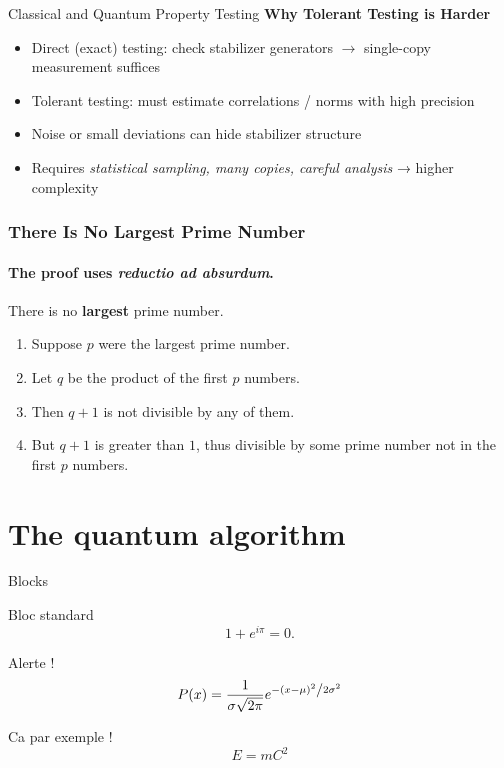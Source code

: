 \documentclass[9pt]{beamer}
\begin{document}
\begin{frame}{Classical and Quantum Property Testing}
\textbf{Why Tolerant Testing is Harder}
\begin{itemize}
    \item Direct (exact) testing: check stabilizer generators $\rightarrow$ single-copy measurement suffices
    \item Tolerant testing: must estimate correlations / norms with high precision
    \item Noise or small deviations can hide stabilizer structure
    \item Requires \textit{statistical sampling, many copies, careful analysis} → higher complexity
\end{itemize}

\end{frame}


\begin{frame} 
\frametitle{There Is No Largest Prime Number} 
\framesubtitle{The proof uses \textit{reductio ad absurdum}.} 
\begin{theorem}
	There is no \textbf{largest} prime number. \end{theorem} 
\begin{enumerate} 
	\item<1-| alert@1> Suppose $p$ were the largest prime number. 
	\item<2-> Let $q$ be the product of the first $p$ numbers. 
	\item<3-> Then $q+1$ is not divisible by any of them. 
	\item<1-> But $q + 1$ is greater than $1$, thus divisible by some prime
	number not in the first $p$ numbers.
\end{enumerate}
\end{frame}

\section{The quantum algorithm}


\begin{frame}{Blocks}

\begin{block}{Bloc standard}
  $$1 + e^{i \pi} = 0.$$
\end{block}

\begin{alertblock}{Alerte !}
$$P(x) = \frac{1}{{\sigma \sqrt {2\pi } }}e^{{{ - \left( {x - \mu } \right)^2 } \mathord{\left/ {\vphantom {{ - \left( {x - \mu } \right)^2 } {2\sigma ^2 }}} \right. \kern-\nulldelimiterspace} {2\sigma ^2 }}}$$
\end{alertblock}
\begin{exampleblock}{Ca par exemple !}
  $$E = m C^2$$
\end{exampleblock}

\end{frame}
\end{document}

